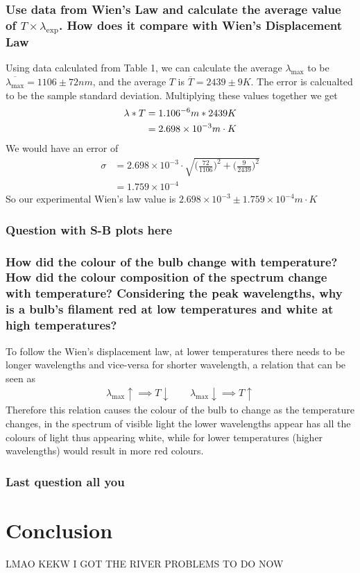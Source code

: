 \documentclass{article}
\begin{document}
\subsubsection*{Use data from Wien's Law and calculate the average value of $T\times \lambda_{\exp}$.
How does it compare with Wien's Displacement Law}
Using data calculated from Table 1, we can calculate the average $\lambda_{\max}$
to be $\overline{\lambda_{\max}} = 1106 \pm 72 nm$, and the average $T$ is 
$\overline{T} = 2439 \pm 9 K$.
The error is calcualted to be the sample standard deviation. Multiplying these
values together we get
\begin{align*}
    \lambda * T &= 1.106\time 10^{-6}m * 2439 K\\
    &= 2.698 \times 10^{-3} m\cdot K
\end{align*}
We would have an error of
\begin{align*}
    \sigma &= 2.698 \times 10^{-3} \cdot \sqrt{\big(\frac{72}{1106}\big)^2 + 
    \big(\frac{9}{2439}\big)^2 }\\
    &= 1.759 \times 10^{-4}
\end{align*}
So our experimental Wien's law value is $2.698 \times 10^{-3} \pm 1.759 
\times 10^{-4} m\cdot K$

\subsubsection*{Question with S-B plots here}

\newpage
\subsubsection*{How did the colour of the bulb change with temperature? How did
the colour composition of the spectrum change with temperature? Considering the
peak wavelengths, why is a bulb's filament red at low temperatures and white at
high temperatures?}
To follow the Wien's displacement law, at lower temperatures there needs to be
longer wavelengths and vice-versa for shorter wavelength, a relation that can be
seen as 
\begin{align*}
    \lambda_{\max}\uparrow \implies T\downarrow \ \ \ \ \ \ \ \ \ 
    \lambda_{\max}\downarrow \implies T\uparrow
\end{align*}
Therefore this relation causes the colour of the bulb to change as the temperature
changes, in the spectrum of visible light the lower wavelengths appear has
all the colours of light thus appearing white, while for lower temperatures 
(higher wavelengths) would result in more red colours.

\subsubsection*{Last question all you}


\section{Conclusion}
LMAO KEKW I GOT THE RIVER PROBLEMS TO DO NOW
\end{document}
